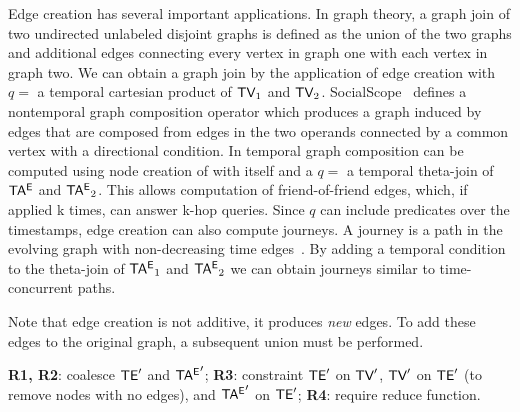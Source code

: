 Edge creation has several important applications.  In graph theory, a
graph join of two undirected unlabeled disjoint graphs is defined as
the union of the two graphs and additional edges connecting every
vertex in graph one with each vertex in graph two.  We can obtain a
graph join by the application of edge creation with $q = $ a temporal
cartesian product of $\textsf{TV}_1$ and $\textsf{TV}_2$.
SocialScope~\cite{Amer-Yahia2009} defines a nontemporal graph
composition operator which produces a graph induced by edges that are
composed from edges in the two operands connected by a common vertex
with a directional condition.  In \ql temporal graph composition can
be computed using node creation of \ttt with itself and a $q = $ a
temporal theta-join of $\mathsf{TA^{E}}$ and $\mathsf{TA^{E}}_2$.  This allows computation
of friend-of-friend edges, which, if applied k times, can answer k-hop
queries.  Since $q$ can include predicates over the timestamps, edge
creation can also compute journeys.  A journey is a path in the
evolving graph with non-decreasing time
edges~\cite{Ferreira2004,Casteigts2011}.  By adding a temporal
condition to the theta-join of $\mathsf{TA^{E}}_1$ and $\mathsf{TA^{E}}_2$ we can obtain
journeys similar to time-concurrent paths.


Note that edge creation is not additive, it produces {\em new} edges.
To add these edges to the original graph, a subsequent union must be
performed.




{\bf R1, R2}: coalesce $\textsf{TE}'$ and $\mathsf{TA^{E}}'$; {\bf R3}: constraint $\textsf{TE}'$
on $\textsf{TV}'$, $\textsf{TV}'$ on $\textsf{TE}'$ (to remove nodes with no edges), and
$\mathsf{TA^{E}}'$ on $\textsf{TE}'$; {\bf R4}: require reduce function.



%
